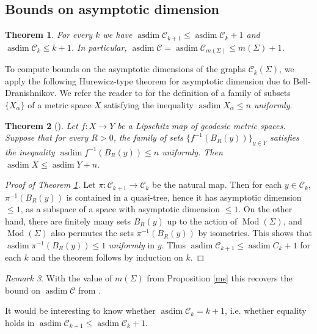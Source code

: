 \documentclass[11pt]{article}
\newtheorem{thm}{Theorem}[section]
\theoremstyle{remark}
\newtheorem{remark}[thm]{Remark}
\def\C{{\mathcal C}}
\def\Mod{\operatorname{Mod}}
\def\asdim{\operatorname{asdim}}
\begin{document}
 


\subsection{Bounds on asymptotic dimension}

\begin{thm}\label{maincor}
  For every $k$ we have $\asdim \C_{k+1}\leq\asdim\C_k +1$
  and $\asdim \C_k\leq k+1$. In
  particular, $\asdim\C=\asdim\C_{m(\Sigma)}\leq m(\Sigma)+1$.
\end{thm}


To compute bounds on the asymptotic dimensions of the graphs $\C_k(\Sigma)$,
we apply the following Hurewicz-type theorem for asymptotic dimension due to
Bell-Dranishnikov. We refer the reader to \cite{Hurewicz} for the definition of
a family of subsets $\{X_\alpha\}$ of a metric space $X$ satisfying the
inequality $\asdim X_\alpha \leq n$ \emph{uniformly}.

\begin{thm}[\cite{Hurewicz}]
  Let $f:X\to Y$ be a Lipschitz map of geodesic metric spaces. Suppose
  that for every $R>0$, the family of sets $\{f^{-1}(B_R(y))\}_{y\in Y}$
  satisfies the inequality $\asdim f^{-1}(B_R(y))\leq n$ uniformly.
  Then $\asdim X\leq \asdim Y + n$.
\end{thm}

\begin{proof}[Proof of Theorem \ref{maincor}]
  Let $\pi:\C_{k+1}\to \C_k$ be the natural map. Then for each
  $y\in \C_k$, $\pi^{-1}(B_R(y))$ is contained in a quasi-tree, hence it
  has asymptotic dimension $\leq 1$, as a subspace of a space with asymptotic
  dimension $\leq 1$. On the other hand, there are finitely many sets $B_R(y)$
  up to the action of $\Mod(\Sigma)$, and $\Mod(\Sigma)$ also permutes the
  sets $\pi^{-1}(B_R(y))$ by isometries. This shows that
  $\asdim \pi^{-1}(B_R(y))\leq 1$ \emph{uniformly} in $y$. Thus
  $\asdim \C_{k+1} \leq \asdim C_k + 1$ for each $k$ and the theorem
  follows by induction on $k$.
\end{proof}

\begin{remark} With the value of $m(\Sigma)$ from Proposition \ref{ms}
  this recovers the bound on $\asdim\C$ from \cite{BB}.
\end{remark}


It would be interesting to know whether $\asdim\C_k=k+1$, i.e. whether
equality holds in $\asdim \C_{k+1} \leq \asdim \C_k + 1$.
\end{document}
